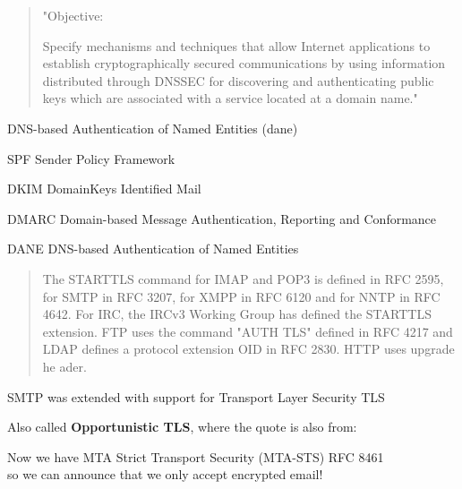 \documentclass[Screen16to9,17pt]{foils}
\begin{document}

\begin{quote}
"Objective:

Specify mechanisms and techniques that allow Internet applications to
establish cryptographically secured communications by using information
distributed through DNSSEC for discovering and authenticating public
keys which are associated with a service located at a domain name."
\end{quote}

\begin{list1}
\item DNS-based Authentication of Named Entities (dane)
\end{list1}


\begin{list2}
\item SPF Sender Policy Framework\\ {\footnotesize{}}
\item DKIM DomainKeys Identified Mail\\
{\footnotesize{}}
\item DMARC Domain-based Message Authentication, Reporting and Conformance\\
{\footnotesize{}}
\item DANE DNS-based Authentication of Named Entities\\ {\footnotesize{}}
\end{list2}



\begin{quote}
The STARTTLS command for IMAP and POP3 is defined in RFC 2595, for SMTP in RFC 3207, for XMPP in RFC 6120 and for NNTP in RFC 4642. For IRC, the IRCv3 Working Group
 has defined the STARTTLS extension. FTP uses the command "AUTH TLS" defined in RFC 4217 and LDAP defines a protocol extension OID in RFC 2830. HTTP uses upgrade he
ader.
\end{quote}

\begin{list1}
\item SMTP was extended with support for Transport Layer Security TLS
\item Also called {\bf Opportunistic TLS}, where the quote is also from:\\ 
\item Now we have MTA Strict Transport Security (MTA-STS) RFC 8461\\
so we can announce that we only accept encrypted email!
\end{list1}
\end{document}
